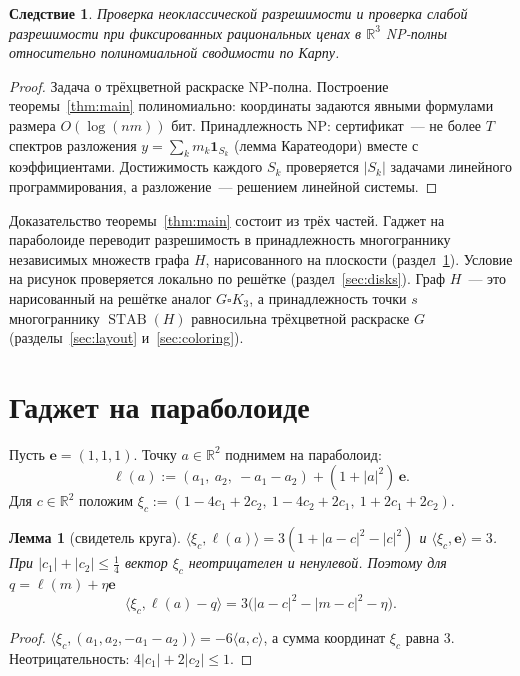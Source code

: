 \documentclass[a4paper,11pt]{article}
\theoremstyle{plain}
\newtheorem{lemma}[theorem]{Лемма}
\newtheorem{corollary}[theorem]{Следствие}
\theoremstyle{definition}
\theoremstyle{remark}
\newcommand{\R}{\mathbb{R}}
\newcommand{\abs}[1]{\left\lvert #1 \right\rvert}
\newcommand{\ip}[2]{\langle #1, #2\rangle}
\DeclareMathOperator{\STAB}{STAB}
\newcommand{\e}{\mathbf e}
\begin{document}
\begin{corollary}
    Проверка неоклассической разрешимости и проверка слабой разрешимости при фиксированных рациональных ценах в $\R^3$ NP-полны относительно полиномиальной сводимости по Карпу.
\end{corollary}

\begin{proof}
    Задача о трёхцветной раскраске NP-полна. Построение теоремы~\ref{thm:main} полиномиально: координаты задаются явными формулами размера $O(\log(nm))$ бит. Принадлежность NP: сертификат~--- не более $T$ спектров разложения $y=\sum_km_k\mathbf 1_{S_k}$ (лемма Каратеодори) вместе с коэффициентами. Достижимость каждого $S_k$ проверяется $\abs{S_k}$ задачами линейного программирования, а разложение~--- решением линейной системы.
\end{proof}

Доказательство теоремы~\ref{thm:main} состоит из трёх частей. Гаджет на параболоиде переводит разрешимость в принадлежность многограннику независимых множеств графа $H$, нарисованного на плоскости (раздел~\ref{sec:gadget}). Условие на рисунок проверяется локально по решётке (раздел~\ref{sec:disks}). Граф $H$~--- это нарисованный на решётке аналог $G\square K_3$, а принадлежность точки $s$ многограннику $\STAB(H)$ равносильна трёхцветной раскраске $G$ (разделы~\ref{sec:layout} и~\ref{sec:coloring}).

\section{Гаджет на параболоиде}\label{sec:gadget}

Пусть $\e=(1,1,1)$. Точку $a\in\R^2$ поднимем на параболоид:
\[
    \ell(a):=(a_1,\ a_2,\ -a_1-a_2)+(1+\abs a^2)\,\e.
\]
Для $c\in\R^2$ положим $\xi_c:=(1-4c_1+2c_2,\ 1-4c_2+2c_1,\ 1+2c_1+2c_2)$.

\begin{lemma}[свидетель круга]\label{lem:wit}
    $\ip{\xi_c}{\ell(a)}=3(1+\abs{a-c}^2-\abs c^2)$ и $\ip{\xi_c}{\e}=3$. При $\abs{c_1}+\abs{c_2}\le\frac14$ вектор $\xi_c$ неотрицателен и ненулевой. Поэтому для $q=\ell(m)+\eta\e$
    \[
        \ip{\xi_c}{\ell(a)-q}=3\bigl(\abs{a-c}^2-\abs{m-c}^2-\eta\bigr).
    \]
\end{lemma}

\begin{proof}
    $\ip{\xi_c}{(a_1,a_2,-a_1-a_2)}=-6\ip ac$, а сумма координат $\xi_c$ равна $3$. Неотрицательность: $4\abs{c_1}+2\abs{c_2}\le1$.
\end{proof}
\end{document}
